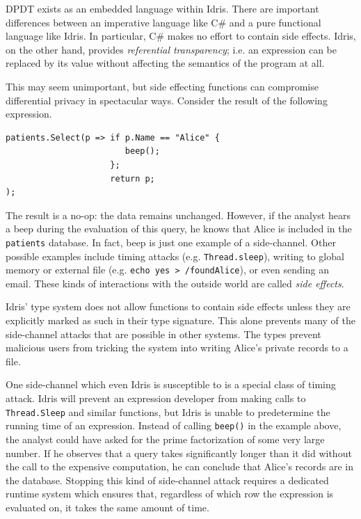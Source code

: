 \documentclass[12pt]{report}
\begin{document}
DPDT exists as an embedded language within Idris.
There are important differences between an imperative language like C\# and a pure functional language like Idris.
In particular, C\# makes no effort to contain side effects.
Idris, on the other hand, provides \textit{referential transparency}; i.e. an expression can be replaced by its value without affecting the semantics of the program at all.

This may seem unimportant, but side effecting functions can compromise differential privacy in spectacular ways.
Consider the result of the following expression.

\begin{lstlisting}[caption={Example side-channel attack}]
patients.Select(p => if p.Name == "Alice" {
                        beep();
                     };
                     return p;
);
\end{lstlisting}

The result is a no-op: the data remains unchanged.
However, if the analyst hears a beep during the evaluation of this query, he knows that Alice is included in the \texttt{patients} database.
In fact, beep is just one example of a side-channel.
Other possible examples include timing attacks (e.g. \texttt{Thread.sleep}), writing to global memory or external file (e.g. \texttt{echo yes > /foundAlice}), or even sending an email.
These kinds of interactions with the outside world are called \textit{side effects}.

Idris' type system does not allow functions to contain side effects unless they are explicitly marked as such in their type signature.
This alone prevents many of the side-channel attacks that are possible in other systems.
The types prevent malicious users from tricking the system into writing Alice's private records to a file.

One side-channel which even Idris is susceptible to is a special class of timing attack.
Idris will prevent an expression developer from making calls to \texttt{Thread.Sleep} and similar functions, but Idris is unable to predetermine the running time of an expression.
Instead of calling \texttt{beep()} in the example above, the analyst could have asked for the prime factorization of some very large number.
If he observes that a query takes significantly longer than it did without the call to the expensive computation, he can conclude that Alice's records are in the database.
Stopping this kind of side-channel attack requires a dedicated runtime system which ensures that, regardless of which row the expression is evaluated on, it takes the same amount of time\cite{conf/uss/HaeberlenPN11}.
\end{document}
